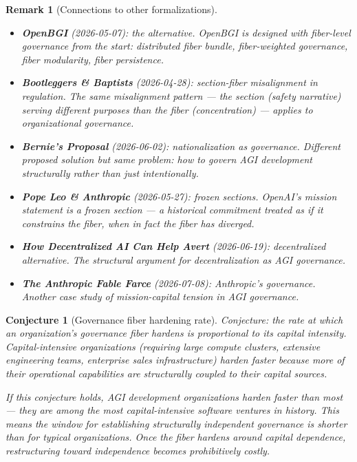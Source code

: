 \documentclass[11pt,a4paper]{article}
\newtheorem{remark}[definition]{Remark}
\newtheorem{conjecture}[definition]{Conjecture}
\begin{document}
\begin{remark}[Connections to other formalizations]
\begin{itemize}
\item \textbf{OpenBGI} (2026-05-07): the alternative. OpenBGI is
  designed with fiber-level governance from the start: distributed
  fiber bundle, fiber-weighted governance, fiber modularity, fiber
  persistence.
\item \textbf{Bootleggers \& Baptists} (2026-04-28): section-fiber
  misalignment in regulation. The same misalignment pattern ---
  the section (safety narrative) serving different purposes than
  the fiber (concentration) --- applies to organizational
  governance.
\item \textbf{Bernie's Proposal} (2026-06-02): nationalization as
  governance. Different proposed solution but same problem:
  how to govern AGI development structurally rather than just
  intentionally.
\item \textbf{Pope Leo \& Anthropic} (2026-05-27): frozen sections.
  OpenAI's mission statement is a frozen section --- a historical
  commitment treated as if it constrains the fiber, when in fact
  the fiber has diverged.
\item \textbf{How Decentralized AI Can Help Avert} (2026-06-19):
  decentralized alternative. The structural argument for
  decentralization as AGI governance.
\item \textbf{The Anthropic Fable Farce} (2026-07-08): Anthropic's
  governance. Another case study of mission-capital tension in AGI
  governance.
\end{itemize}
\end{remark}

\begin{conjecture}[Governance fiber hardening rate]
Conjecture: the rate at which an organization's governance fiber
hardens is proportional to its capital intensity. Capital-intensive
organizations (requiring large compute clusters, extensive
engineering teams, enterprise sales infrastructure) harden faster
because more of their operational capabilities are structurally
coupled to their capital sources.

If this conjecture holds, AGI development organizations harden
faster than most --- they are among the most capital-intensive
software ventures in history. This means the window for
establishing structurally independent governance is shorter than
for typical organizations. Once the fiber hardens around capital
dependence, restructuring toward independence becomes
prohibitively costly.
\end{conjecture}
\end{document}
